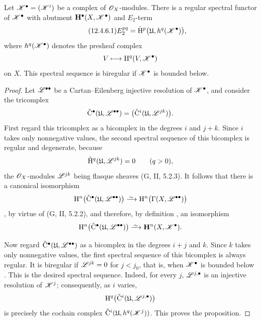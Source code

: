 \begin{proposition}[12.4.6]
\label{0.12.4.6}
Let $\mathscr{K}^\bullet=(\mathscr{K}^i)$ be a complex of
$\mathscr{O}_X$-modules.
There is a regular spectral functor of $\mathscr{K}^\bullet$ with
abutment $\mathbf{H}^\bullet(X,\mathscr{K}^\bullet)$ and $E_2$-term
\begin{equation}
\label{0.12.4.6.1}
\tag{12.4.6.1}
  E_2^{pq}
  =
  \check{\mathrm{H}}^p\bigl(\mathfrak{U},h^q(\mathscr{K}^\bullet)\bigr),
\end{equation}
where $h^q(\mathscr{K}^\bullet)$ denotes the presheaf complex
\[
  V\longmapsto\mathrm{H}^q(V,\mathscr{K}^\bullet)
\]
on $X$.
This spectral sequence is biregular if $\mathscr{K}^\bullet$ is bounded
below.
\end{proposition}

\begin{proof}
Let $\mathscr{L}^{\bullet\bullet}$ be a Cartan--Eilenberg injective
resolution of $\mathscr{K}^\bullet$, and consider the tricomplex
\[
  \check{\mathrm{C}}^\bullet
  (\mathfrak{U},\mathscr{L}^{\bullet\bullet})
  =
  \bigl(\check{\mathrm{C}}^i
    (\mathfrak{U},\mathscr{L}^{jk})\bigr).
\]
First regard this tricomplex as a bicomplex in the degrees $i$ and
$j+k$.
Since $i$ takes only nonnegative values, the second spectral sequence
of this bicomplex is regular  and degenerate, because
\[
  \check{\mathrm{H}}^q(\mathfrak{U},\mathscr{L}^{jk})=0
  \qquad(q>0),
\]
the $\mathscr{O}_X$-modules $\mathscr{L}^{jk}$ being flasque sheaves
(G, II, 5.2.3).
It follows that there is a canonical isomorphism
\[
  \HH^n\bigl(
    \check{\mathrm{C}}^\bullet
      (\mathfrak{U},\sh{L}^{\bullet\bullet})
  \bigr)
  \isoto
  \HH^n\bigl(\Gamma(X,\sh{L}^{\bullet\bullet})\bigr)
\]
, by virtue of (G, II, 5.2.2), and therefore, by
definition , an isomorphism
\[
  \HH^n\bigl(
    \check{\mathrm{C}}^\bullet
      (\mathfrak{U},\sh{L}^{\bullet\bullet})
  \bigr)
  \isoto
  \bb{H}^n(X,\sh{K}^\bullet).
\]

Now regard
$\check{\mathrm{C}}^\bullet
(\mathfrak{U},\mathscr{L}^{\bullet\bullet})$
as a bicomplex in the degrees $i+j$ and $k$.
Since $k$ takes only nonnegative values, the first spectral sequence
of this bicomplex is always regular.
It is biregular if $\mathscr{L}^{jk}=0$ for $j<j_0$, that is, when
$\mathscr{K}^\bullet$ is bounded below .
This is the desired spectral sequence.
Indeed, for every $j$, $\mathscr{L}^{j,\bullet}$ is an injective
resolution of $\mathscr{K}^j$; consequently, as $i$ varies,
\[
  \mathrm{H}^q\bigl(
    \check{\mathrm{C}}^i
      (\mathfrak{U},\mathscr{L}^{j,\bullet})
  \bigr)
\]
is precisely the cochain complex
$\check{\mathrm{C}}^i(\mathfrak{U},h^q(\mathscr{K}^j))$.
This proves the proposition.
\end{proof}

